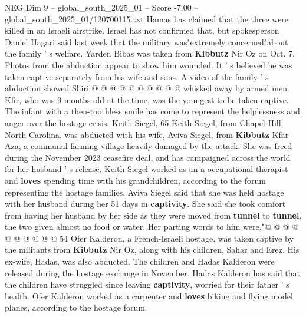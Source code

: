 \begin{textsample}{NEG Dim 9 – global\_south\_2025\_01 – Score -7.00 – global\_south\_2025\_01/120700115.txt}
Hamas has claimed that the three were killed in an Israeli airstrike.
Israel has not confirmed that, but spokesperson Daniel Hagari said last week that the military was"extremely concerned"about the family ' s welfare.
Yarden Bibas was taken from \textbf{Kibbutz} Nir Oz on Oct. 7.
Photos from the abduction appear to show him wounded.
It ' s believed he was taken captive separately from his wife and sons.
A video of the family ' s abduction showed Shiri @ @ @ @ @ @ @ @ @ @ whisked away by armed men.
Kfir, who was 9 months old at the time, was the youngest to be taken captive.
The infant with a then-toothless smile has come to represent the helplessness and anger over the hostage crisis.
Keith Siegel, 65 Keith Siegel, from Chapel Hill, North Carolina, was abducted with his wife, Aviva Siegel, from \textbf{Kibbutz} Kfar Aza, a communal farming village heavily damaged by the attack.
She was freed during the November 2023 ceasefire deal, and has campaigned across the world for her husband ' s release.
Keith Siegel worked as an a occupational therapist and \textbf{loves} spending time with his grandchildren, according to the forum representing the hostage families.
Aviva Siegel said that she was held hostage with her husband during her 51 days in \textbf{captivity}.
She said she took comfort from having her husband by her side as they were moved from \textbf{tunnel} to \textbf{tunnel}, the two given almost no food or water.
Her parting words to him were,"@ @ @ @ @ @ @ @ @ @ 54 Ofer Kalderon, a French-Israeli hostage, was taken captive by the militants from \textbf{Kibbutz} Nir Oz, along with his children, Sahar and Erez.
His ex-wife, Hadas, was also abducted.
The children and Hadas Kalderon were released during the hostage exchange in November.
Hadas Kalderon has said that the children have struggled since leaving \textbf{captivity}, worried for their father ' s health.
Ofer Kalderon worked as a carpenter and \textbf{loves} biking and flying model planes, according to the hostage forum.

\end{textsample}
